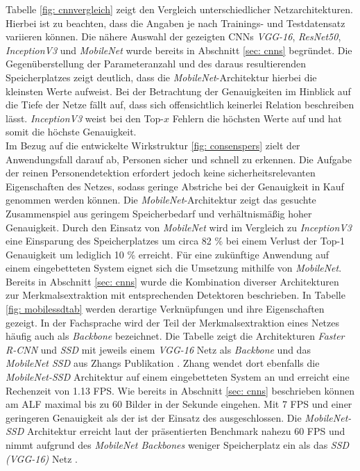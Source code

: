 			
		
		Tabelle \ref{fig: cnnvergleich} zeigt den Vergleich unterschiedlicher Netzarchitekturen. Hierbei ist zu beachten, dass die Angaben je nach Trainings- und Testdatensatz variieren können. Die nähere Auswahl der gezeigten CNNs \textit{VGG-16}, \textit{ResNet50}, \textit{InceptionV3} und \textit{MobileNet} wurde bereits in Abschnitt \ref{sec: cnns} begründet. Die Gegenüberstellung der Parameteranzahl und des daraus resultierenden Speicherplatzes zeigt deutlich, dass die \textit{MobileNet}-Architektur hierbei die kleinsten Werte aufweist. Bei der Betrachtung der Genauigkeiten im Hinblick auf die Tiefe der Netze fällt auf, dass sich offensichtlich keinerlei Relation beschreiben lässt. \textit{InceptionV3} weist bei den Top-$x$ Fehlern die höchsten Werte auf und hat somit die höchste Genauigkeit.\\
		
		Im Bezug auf die entwickelte Wirkstruktur \ref{fig: consenspers} zielt der Anwendungsfall darauf ab, Personen sicher und schnell zu erkennen. Die Aufgabe der reinen Personendetektion erfordert jedoch keine sicherheitsrelevanten Eigenschaften des Netzes, sodass geringe Abstriche bei der Genauigkeit in Kauf genommen werden können. Die \textit{MobileNet}-Architektur zeigt das gesuchte Zusammenspiel aus geringem Speicherbedarf und verhältnismäßig hoher Genauigkeit. Durch den Einsatz von \textit{MobileNet} wird im Vergleich zu \textit{InceptionV3} eine Einsparung des Speicherplatzes um circa 82 \% bei einem Verlust der Top-1 Genauigkeit um lediglich 10 \% erreicht. Für eine zukünftige Anwendung auf einem eingebetteten System eignet sich die Umsetzung mithilfe von \textit{MobileNet}.\\
		
		
		
		Bereits in Abschnitt \ref{sec: cnns} wurde die Kombination diverser Architekturen zur Merkmalsextraktion mit entsprechenden Detektoren beschrieben. In Tabelle \ref{fig: mobilessdtab} werden derartige Verknüpfungen und ihre Eigenschaften gezeigt. In der Fachsprache wird der Teil der Merkmalsextraktion eines Netzes häufig auch als \textit{Backbone} bezeichnet. Die Tabelle zeigt die Architekturen \textit{Faster R-CNN} und \textit{SSD} mit jeweils einem \textit{VGG-16} Netz als \textit{Backbone} und das \textit{MobileNet SSD} aus Zhangs Publikation \cite{embedded}. Zhang wendet dort ebenfalls die \textit{MobileNet-SSD} Architektur auf einem eingebetteten System an und erreicht eine Rechenzeit von 1.13 FPS. Wie bereits in Abschnitt \ref{sec: cnns} beschrieben können am ALF maximal bis zu 60 Bilder in der Sekunde eingehen. Mit 7 FPS und einer geringeren Genauigkeit als der  ist der Einsatz des  ausgeschlossen. Die \textit{MobileNet-SSD} Architektur erreicht laut der präsentierten Benchmark nahezu 60 FPS und nimmt aufgrund des \textit{MobileNet Backbones} weniger Speicherplatz ein als das \textit{SSD (VGG-16)} Netz \cite{leightweight}. \\ 
		
